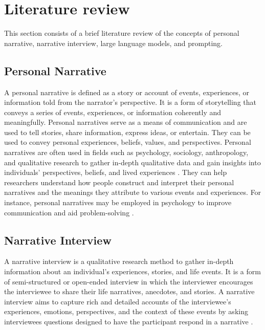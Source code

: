 \chapter{Literature review}
\label{cha:literature_review}
This section consists of a brief literature review of the concepts of personal narrative, narrative interview, large language models, and prompting. 


\section{Personal Narrative}
A personal narrative is defined as a story or account of events, experiences, or information told from the narrator's perspective. It is a form of storytelling that conveys a series of events, experiences, or information coherently and meaningfully. Personal narratives serve as a means of communication and are used to tell stories, share information, express ideas, or entertain. They can be used to convey personal experiences, beliefs, values, and perspectives. Personal narratives are often used in fields such as psychology, sociology, anthropology, and qualitative research to gather in-depth qualitative data and gain insights into individuals' perspectives, beliefs, and lived experiences \cite{Nurser2018-id,Charon2009-na}. They can help researchers understand how people construct and interpret their personal narratives and the meanings they attribute to various events and experiences. For instance, personal narratives may be employed in psychology to improve communication and aid problem-solving \cite{Kim2015-es}.


\section{Narrative Interview}
A narrative interview is a qualitative research method to gather in-depth information about an individual's experiences, stories, and life events. It is a form of semi-structured or open-ended interview in which the interviewer encourages the interviewee to share their life narratives, anecdotes, and stories. A narrative interview aims to capture rich and detailed accounts of the interviewee's experiences, emotions, perspectives, and the context of these events by asking interviewees questions designed to have the participant respond in a narrative \cite{Jovchelovitch2000-xs}.


